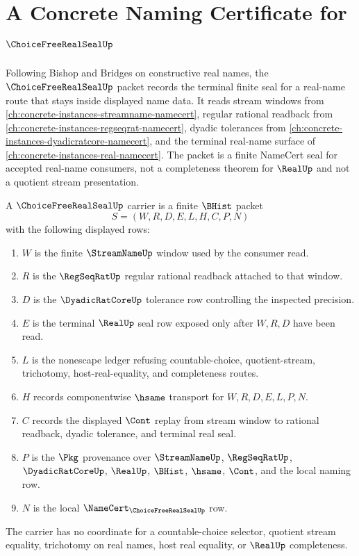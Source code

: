 \chapter{A Concrete Naming Certificate for $\ChoiceFreeRealSealUp$}
\label{ch:concrete-instances-choice-free-real-seal-namecert}

Following Bishop and Bridges on constructive real names, the $\ChoiceFreeRealSealUp$ packet records the terminal finite seal for a real-name route that stays inside displayed name data. It reads stream windows from \autoref{ch:concrete-instances-streamname-namecert}, regular rational readback from \autoref{ch:concrete-instances-regseqrat-namecert}, dyadic tolerances from \autoref{ch:concrete-instances-dyadicratcore-namecert}, and the terminal real-name surface of \autoref{ch:concrete-instances-real-namecert}. The packet is a finite NameCert seal for accepted real-name consumers, not a completeness theorem for $\RealUp$ and not a quotient stream presentation.

\begin{definition}
\label{def:choice-free-real-seal-carrier}
A $\ChoiceFreeRealSealUp$ carrier is a finite $\BHist$ packet
$$
S=(W,R,D,E,L,H,C,P,N)
$$
with the following displayed rows:
\begin{enumerate}
\item $W$ is the finite $\StreamNameUp$ window used by the consumer read.
\item $R$ is the $\RegSeqRatUp$ regular rational readback attached to that window.
\item $D$ is the $\DyadicRatCoreUp$ tolerance row controlling the inspected precision.
\item $E$ is the terminal $\RealUp$ seal row exposed only after $W,R,D$ have been read.
\item $L$ is the nonescape ledger refusing countable-choice, quotient-stream, trichotomy, host-real-equality, and completeness routes.
\item $H$ records componentwise $\hsame$ transport for $W,R,D,E,L,P,N$.
\item $C$ records the displayed $\Cont$ replay from stream window to rational readback, dyadic tolerance, and terminal real seal.
\item $P$ is the $\Pkg$ provenance over $\StreamNameUp$, $\RegSeqRatUp$, $\DyadicRatCoreUp$, $\RealUp$, $\BHist$, $\hsame$, $\Cont$, and the local naming row.
\item $N$ is the local $\NameCert_{\ChoiceFreeRealSealUp}$ row.
\end{enumerate}
The carrier has no coordinate for a countable-choice selector, quotient stream equality, trichotomy on real names, host real equality, or $\RealUp$ completeness.
\end{definition}

